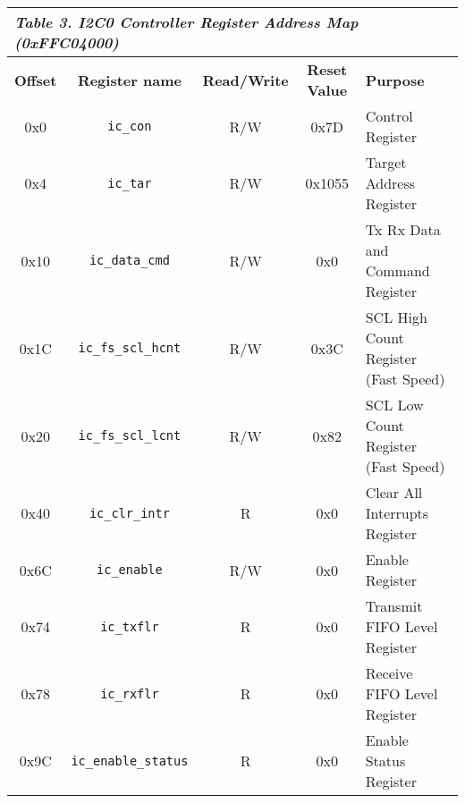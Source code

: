 \begin{table}[h]

    \centering
    \begin{tabular}{|c|c|c|c|p{7cm}|}
        \hline
        \multicolumn{5}{|l|}{\textit{\textbf{Table 3. I2C0 Controller Register Address Map (0xFFC04000)}}}
        \\\hline
            \textbf{Offset}
            & \textbf{Register name}
            & \textbf{Read/Write}
            & \textbf{Reset Value}
            & \textbf{Purpose}
        \\\hline
            0x0
            & \texttt{ic\_con}
            & R/W
            & 0x7D
            & Control Register
        \\\hline
            0x4
            & \texttt{ic\_tar}
            & R/W
            & 0x1055
            & Target Address Register
        \\\hline
            0x10
            & \texttt{ic\_data\_cmd}
            & R/W
            & 0x0
            & Tx Rx Data and Command Register
        \\\hline
            0x1C
            & \texttt{ic\_fs\_scl\_hcnt}
            & R/W
            & 0x3C
            & SCL High Count Register (Fast Speed)
        \\\hline
            0x20
            & \texttt{ic\_fs\_scl\_lcnt}
            & R/W
            & 0x82
            & SCL Low Count Register (Fast Speed)
        \\\hline
            0x40
            & \texttt{ic\_clr\_intr}
            & R
            & 0x0
            & Clear All Interrupts Register
        \\\hline
            0x6C
            & \texttt{ic\_enable}
            & R/W
            & 0x0
            & Enable Register
        \\\hline
            0x74
            & \texttt{ic\_txflr}
            & R
            & 0x0
            & Transmit FIFO Level Register
        \\\hline
            0x78
            & \texttt{ic\_rxflr}
            & R
            & 0x0
            & Receive FIFO Level Register
        \\\hline
            0x9C
            & \texttt{ic\_enable\_status}
            & R
            & 0x0
            & Enable Status Register
        \\\hline
    \end{tabular}
    \label{tab:i2c_ctrl_regtable}
\end{table}